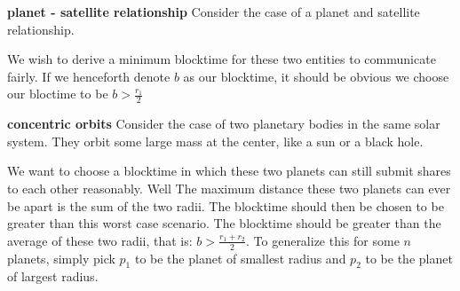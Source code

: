 \documentclass[conference]{IEEEtran}
\begin{document}
\textbf{planet - satellite relationship}
Consider the case of a planet and satellite relationship.

\begin{center}
\end{center}
We wish to derive a minimum blocktime for these two entities to communicate fairly. If we henceforth denote $b$ as our blocktime, it should be obvious we choose our bloctime to be $b > \frac{r_1}{2}$


\textbf{concentric orbits}
Consider the case of two planetary bodies in the same solar system. They orbit some large mass at the center, like a sun or a black hole. 
\begin{center}
\end{center}


We want to choose a blocktime in which these two planets can still submit shares to each other reasonably. Well The maximum distance these two planets can ever be apart is the sum of the two radii. The blocktime should then be chosen to be greater than this worst case scenario. The blocktime should be greater than the average of these two radii, that is: $b > \frac{r_1+r_2}{2}$. To generalize this for some $n$ planets, simply pick $p_1$ to be the planet of smallest radius and $p_2$ to be the planet of largest radius.
\end{document}
